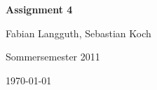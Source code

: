 



\begin{center}
    \huge {\bf Assignment 4}
    
    \small Fabian Langguth, Sebastian Koch
    
    Sommersemester 2011
    
    \today
\end{center}


%



